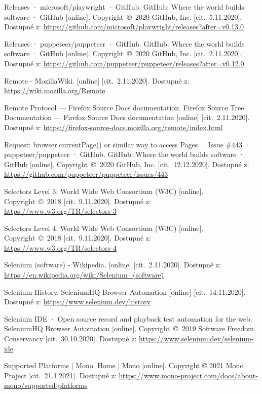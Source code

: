 \begin{thebibliography}{99}
 Releases · microsoft/playwright · GitHub. GitHub: Where the world builds software · GitHub [online]. Copyright~©~2020 GitHub, Inc. [cit.~5.11.2020]. Dostupné z: \url{https://github.com/microsoft/playwright/releases?after=v0.13.0}

 Releases · puppeteer/puppeteer · GitHub. GitHub: Where the world builds software · GitHub [online]. Copyright~©~2020 GitHub, Inc. [cit.~2.11.2020]. Dostupné z: \url{https://github.com/puppeteer/puppeteer/releases?after=v0.12.0}

 Remote - MozillaWiki. [online] [cit.~2.11.2020]. Dostupné z: \url{https://wiki.mozilla.org/Remote}

 Remote Protocol — Firefox Source Docs documentation. Firefox Source Tree Documentation — Firefox Source Docs documentation [online] [cit.~2.11.2020]. Dostupné z: \url{https://firefox-source-docs.mozilla.org/remote/index.html}

 Request: browser.currentPage() or similar way to access Pages · Issue \#443 · puppeteer/puppeteer · GitHub. GitHub: Where the world builds software · GitHub [online]. Copyright~©~2020 GitHub, Inc. [cit.~12.12.2020]. Dostupné z: \url{https://github.com/puppeteer/puppeteer/issues/443}

 Selectors Level 3. World Wide Web Consortium (W3C) [online]. Copyright~©~2018 [cit.~9.11.2020]. Dostupné z: \url{https://www.w3.org/TR/selectors-3}

 Selectors Level 4. World Wide Web Consortium (W3C) [online]. Copyright~©~2018 [cit.~9.11.2020]. Dostupné z: \url{https://www.w3.org/TR/selectors-4}

 Selenium (software) - Wikipedia. [online] [cit.~2.11.2020]. Dostupné z: \url{https://en.wikipedia.org/wiki/Selenium_(software)}

 Selenium History. SeleniumHQ Browser Automation [online] [cit.~14.11.2020]. Dostupné z: \url{https://www.selenium.dev/history}

 Selenium IDE · Open source record and playback test automation for the web. SeleniumHQ Browser Automation [online]. Copyright~©~2019 Software Freedom Conservancy [cit.~30.10.2020]. Dostupné z: \url{https://www.selenium.dev/selenium-ide}

 Supported Platforms | Mono. Home | Mono [online]. Copyright © 2021 Mono Project [cit.~21.1.2021]. Dostupné z: \url{https://www.mono-project.com/docs/about-mono/supported-platforms}


\end{thebibliography}
